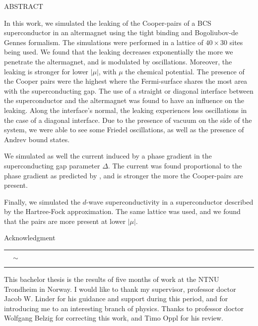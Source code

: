 \documentclass[../main.tex]{subfile}
\begin{document}
\thispagestyle{empty}
\vspace*{24pt}
\begin{center}
    \LARGE ABSTRACT \normalsize\vspace{24pt}\\
\end{center}
In this work, we simulated the leaking of the Cooper-pairs of a BCS superconductor \cite{FossheimSudbo2004} in an altermagnet \cite{Smejkal2022} using the tight binding and
Bogoliubov-de Gennes formalism. The simulations were performed in a lattice of $40\times30$ sites being used.
We found that the leaking decreases exponentially the more we penetrate the altermagnet, and is modulated by oscillations.
Moreover, the leaking is stronger for lower $|\mu|$, with $\mu$ the chemical potential. The presence of the Cooper pairs were the highest where 
the Fermi-surface shares the most area with the superconducting gap. The use of a straight or diagonal interface
between the superconductor and the altermagnet was found to have an influence on the leaking. Along the interface's normal, the leaking experiences less oscillations
in the case of a diagonal interface. Due to the presence of vacuum on the side of the system, we were able to see some Friedel oscillations, as well as
the presence of Andrev bound states.

We simulated as well the current induced by a phase gradient in the superconducting gap parameter $\Delta$.
The current was found proportional to the phase gradient as predicted by \cite{Orlando2003},
and is stronger the more the Cooper-pairs are present.

Finally, we simulated the $d$-wave superconductivity \cite{Mjos2019} in a superconductor described by the Hartree-Fock approximation.
The same lattice was used, and we found that the pairs are more present at lower $|\mu|$.


\newpage
\thispagestyle{empty}
\vspace*{24pt}
\begin{center}
    \LARGE Acknowledgment \normalsize\vspace{24pt}\\
    \rule[3pt]{0.04\textwidth}{0.2pt} $\quad\sim\quad$\rule[3pt]{.04\textwidth}{0.2pt} 
\end{center}
\vspace*{12pt}


This bachelor thesis is the results of five months of work at the NTNU Trondheim in Norway. I would like to thank my supervisor, professor doctor Jacob W. Linder
for his guidance and support during this period, and for introducing me to an interesting branch of physics. Thanks to professor doctor Wolfgang Belzig for 
correcting this work, and Timo Oppl for his review.\\
\end{document}
